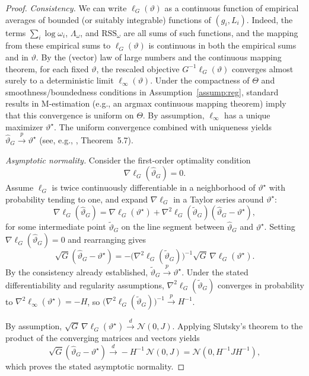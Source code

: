 \begin{proof}
\emph{Consistency.}
We can write \(\ell_G(\vartheta)\) as a continuous function of empirical averages of bounded (or suitably integrable) functions of \((g_i,L_i)\).
Indeed, the terms \(\sum_i \log\omega_i\), \(\Lambda_\omega\), and \(\mathrm{RSS}_\omega\) are all sums of such functions, and the mapping from these empirical sums to \(\ell_G(\vartheta)\) is continuous in both the empirical sums and in \(\vartheta\).
By the (vector) law of large numbers and the continuous mapping theorem, for each fixed \(\vartheta\), the rescaled objective \(G^{-1}\ell_G(\vartheta)\) converges almost surely to a deterministic limit \(\ell_\infty(\vartheta)\).
Under the compactness of \(\Theta\) and smoothness/boundedness conditions in Assumption~\ref{assump:reg}, standard results in M-estimation (e.g., an argmax continuous mapping theorem) imply that this convergence is uniform on \(\Theta\).
By assumption, \(\ell_\infty\) has a unique maximizer \(\vartheta^\star\).
The uniform convergence combined with uniqueness yields
\(\widehat\vartheta_G\xrightarrow{p}\vartheta^\star\) (see, e.g., \citet{vandervaart1998}, Theorem~5.7).

\emph{Asymptotic normality.}
Consider the first-order optimality condition
\[
\nabla \ell_G(\widehat\vartheta_G)=0.
\]
Assume \(\ell_G\) is twice continuously differentiable in a neighborhood of \(\vartheta^\star\) with probability tending to one, and expand \(\nabla \ell_G\) in a Taylor series around \(\vartheta^\star\):
\[
\nabla \ell_G(\widehat\vartheta_G)
=\nabla \ell_G(\vartheta^\star)
+\nabla^2\ell_G(\tilde\vartheta_G)(\widehat\vartheta_G-\vartheta^\star),
\]
for some intermediate point \(\tilde\vartheta_G\) on the line segment between \(\widehat\vartheta_G\) and \(\vartheta^\star\).
Setting \(\nabla \ell_G(\widehat\vartheta_G)=0\) and rearranging gives
\[
\sqrt{G}(\widehat\vartheta_G-\vartheta^\star)
=-\Big(\nabla^2\ell_G(\tilde\vartheta_G)\Big)^{-1}\sqrt{G}\,\nabla \ell_G(\vartheta^\star).
\]
By the consistency already established, \(\tilde\vartheta_G\xrightarrow{p}\vartheta^\star\).
Under the stated differentiability and regularity assumptions,
\(\nabla^2\ell_G(\tilde\vartheta_G)\) converges in probability to \(\nabla^2\ell_\infty(\vartheta^\star)=-H\),
so \(\big(\nabla^2\ell_G(\tilde\vartheta_G)\big)^{-1}\xrightarrow{p}H^{-1}\).

By assumption,
\(\sqrt{G}\,\nabla \ell_G(\vartheta^\star)\xrightarrow{d}\mathcal N(0,J)\).
Applying Slutsky’s theorem to the product of the converging matrices and vectors yields
\[
\sqrt{G}(\widehat\vartheta_G-\vartheta^\star)
\xrightarrow{d}
-H^{-1}\,\mathcal N(0,J)
=\mathcal N(0,H^{-1}JH^{-1}),
\]
which proves the stated asymptotic normality.
\end{proof}

